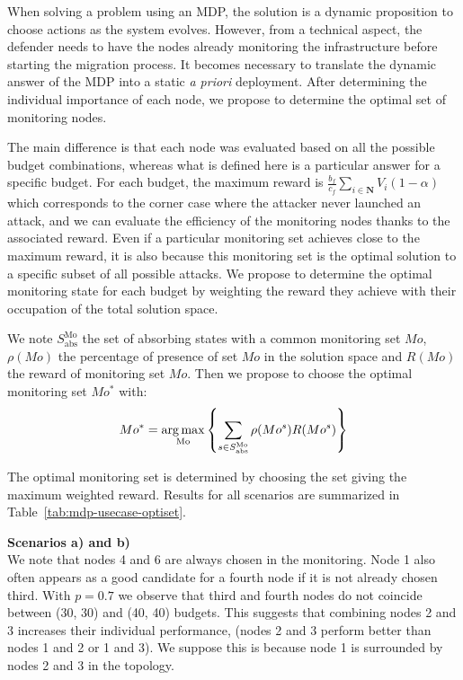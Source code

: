 When solving a problem using an MDP, the solution is a dynamic proposition to choose actions as the system evolves.
However, from a technical aspect, the defender needs to have the nodes already monitoring the infrastructure before starting the migration process.
It becomes necessary to translate the dynamic answer of the MDP into a static \textit{a priori} deployment.
After determining the individual importance of each node, we propose to determine the optimal set of monitoring nodes.

The main difference is that each node was evaluated based on all the possible budget combinations, whereas what is defined here is a particular answer for a specific budget.
For each budget, the maximum reward is $\frac{b_f}{c_f} \sum\limits_{i \in \textbf{N}}V_i(1-\alpha) $ which corresponds to the corner case where the attacker never launched an attack, and we can evaluate the efficiency of the  monitoring nodes thanks to the associated reward.
Even if a particular monitoring set achieves close to the maximum reward, it is also because this monitoring set is the optimal solution to a specific subset of all possible attacks.
We propose to determine the optimal monitoring state for each budget by weighting the reward they achieve with their occupation of the total solution space.

We note $S^{\text{Mo}}_{\text{abs}}$ the set of absorbing states with a common  monitoring set $Mo$, $\rho(Mo)$ the percentage of presence of set $Mo$ in the solution space and $R(Mo)$ the reward of monitoring set $Mo$.
Then we propose to choose the optimal monitoring set $Mo^*$ with:
\begin{equation}
    Mo^* = \operatorname*{arg\,max}\limits_{\text{Mo}} \left \{\sum\limits_{s \in S^{\text{Mo}}_{\text{abs}}}\rho(Mo^s)R(Mo^s) \right \}
\end{equation}

The optimal monitoring set is determined by choosing the set giving the maximum weighted reward.
Results for all scenarios are summarized in Table~\ref{tab:mdp-usecase-optiset}.



\textbf{Scenarios a) and b)\\}
We note that nodes 4 and 6 are always chosen in the monitoring.
Node 1 also often appears as a good candidate for a fourth node if it is not already chosen third.
With $p=0.7$ we observe that third and fourth nodes do not coincide between (30, 30) and (40, 40) budgets.
This suggests that combining nodes 2 and 3 increases their individual performance, (\ie nodes 2 and 3 perform better than nodes 1 and 2 or 1 and 3).
We suppose this is because node 1 is surrounded by nodes 2 and 3 in the topology.

